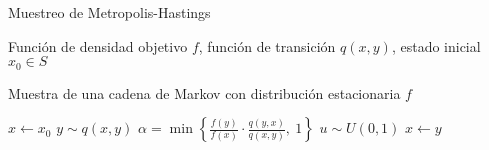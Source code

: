 \begin{algorithm}
\caption{Muestreo de Metropolis-Hastings}
\label{alg:Metropolis-Hastings}
\begin{algorithmic}[1]
\vspace{0.2cm}
\Require \parbox[t]{13cm}{
    Función de densidad objetivo $f$, función de transición $q(x,y)$,
    estado inicial $x_0\in S$
}
\vspace{0.2cm}
\Ensure 
\parbox[t]{13cm}{
    Muestra de una cadena de Markov con distribución estacionaria $f$
}
\vspace{0.2cm}
\State $x \leftarrow x_0$
    \State $y \sim q(x, y)$
    \State $\alpha = \min\left\{\frac{f(y)}{f(x)}\cdot \frac{q(y,x)}{q(x,y)},\ 1\right\}$
    \State $u \sim U(0,1)$
        \State $x \leftarrow y$
    \EndIf
\EndFor
\end{algorithmic}
\end{algorithm}




